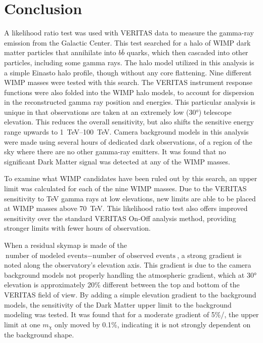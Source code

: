 \cleartooddpage[\thispagestyle{empty}]
\chapter{Conclusion}

A likelihood ratio test was used with VERITAS data to measure the gamma-ray emission from the Galactic Center.
This test searched for a halo of WIMP dark matter particles that annihilate into $b\bar{b}$ quarks, which then cascaded into other particles, including some gamma rays.
The halo model utilized in this analysis is a simple Einasto halo profile, though without any core flattening.
Nine different WIMP masses were tested with this search.
The VERITAS instrument response functions were also folded into the WIMP halo models, to account for dispersion in the reconstructed gamma ray position and energies.
This particular analysis is unique in that observations are taken at an extremely low (\nicetilde{}\ang{30}) telescope elevation.
This reduces the overall sensitivity, but also shifts the sensitive energy range upwards to \SIrange{1}{100}{TeV}.
Camera background models in this analysis were made using several hours of dedicated dark observations, of a region of the sky where there are no other gamma-ray emitters.
It was found that no significant Dark Matter signal was detected at any of the WIMP masses.

To examine what WIMP candidates have been ruled out by this search, an upper limit was calculated for each of the nine WIMP masses.
Due to the VERITAS sensitivity to TeV gamma rays at low elevations, new limits are able to be placed at WIMP masses above \SI{70}{TeV}.
This likelihood ratio test also offers improved sensitivity over the standard VERITAS On-Off analysis method, providing stronger limits with fewer hours of observation.

When a residual skymap is made of the $\textrm{number of modeled events} - \textrm{number of observed events}$, a strong gradient is noted along the observatory's elevation axis.
This gradient is due to the camera background models not properly handling the atmospheric gradient, which at \ang{30} elevation is approximately \nicetilde{}20\% different between the top and bottom of the VERITAS field of view.
By adding a simple elevation gradient to the background models, the sensitivity of the Dark Matter upper limit to the background modeling was tested.
It was found that for a moderate gradient of 5\%/\degree{}, the upper limit at one $m_{\chi}$ only moved by 0.1\%, indicating it is not strongly dependent on the background shape.

